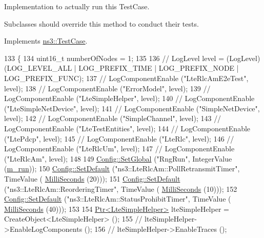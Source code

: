 Implementation to actually run this Test\+Case. 

Subclasses should override this method to conduct their tests. 

Implements \hyperlink{classns3_1_1TestCase_a8ff74680cf017ed42011e4be51917a24}{ns3\+::\+Test\+Case}.


\begin{DoxyCode}
133 \{
134   uint16\_t numberOfNodes = 1;
135 
136   \textcolor{comment}{// LogLevel level = (LogLevel) (LOG\_LEVEL\_ALL | LOG\_PREFIX\_TIME | LOG\_PREFIX\_NODE | LOG\_PREFIX\_FUNC);}
137   \textcolor{comment}{// LogComponentEnable ("LteRlcAmE2eTest", level);}
138   \textcolor{comment}{// LogComponentEnable ("ErrorModel", level);}
139   \textcolor{comment}{// LogComponentEnable ("LteSimpleHelper", level);}
140   \textcolor{comment}{// LogComponentEnable ("LteSimpleNetDevice", level);}
141   \textcolor{comment}{// LogComponentEnable ("SimpleNetDevice", level);}
142   \textcolor{comment}{// LogComponentEnable ("SimpleChannel", level);}
143   \textcolor{comment}{// LogComponentEnable ("LteTestEntities", level);}
144   \textcolor{comment}{// LogComponentEnable ("LtePdcp", level);}
145   \textcolor{comment}{// LogComponentEnable ("LteRlc", level);}
146   \textcolor{comment}{// LogComponentEnable ("LteRlcUm", level);}
147   \textcolor{comment}{// LogComponentEnable ("LteRlcAm", level);}
148 
149   \hyperlink{group__config_ga0e12663a7bd119b65d0a219a578f2a3c}{Config::SetGlobal} (\textcolor{stringliteral}{"RngRun"}, IntegerValue (\hyperlink{classLteRlcAmE2eTestCase_af47c853d67661e384fbed678b588a6e5}{m\_run}));
150   \hyperlink{group__config_ga2e7882df849d8ba4aaad31c934c40c06}{Config::SetDefault} (\textcolor{stringliteral}{"ns3::LteRlcAm::PollRetransmitTimer"}, TimeValue (
      \hyperlink{group__timecivil_gaf26127cf4571146b83a92ee18679c7a9}{MilliSeconds} (20)));
151   \hyperlink{group__config_ga2e7882df849d8ba4aaad31c934c40c06}{Config::SetDefault} (\textcolor{stringliteral}{"ns3::LteRlcAm::ReorderingTimer"}, TimeValue (
      \hyperlink{group__timecivil_gaf26127cf4571146b83a92ee18679c7a9}{MilliSeconds} (10)));
152   \hyperlink{group__config_ga2e7882df849d8ba4aaad31c934c40c06}{Config::SetDefault} (\textcolor{stringliteral}{"ns3::LteRlcAm::StatusProhibitTimer"}, TimeValue (
      \hyperlink{group__timecivil_gaf26127cf4571146b83a92ee18679c7a9}{MilliSeconds} (40)));
153 
154   \hyperlink{classns3_1_1Ptr}{Ptr<LteSimpleHelper>} lteSimpleHelper = CreateObject<LteSimpleHelper> ();
155   \textcolor{comment}{// lteSimpleHelper->EnableLogComponents ();}
156   \textcolor{comment}{// lteSimpleHelper->EnableTraces ();}

\end{DoxyCode}
